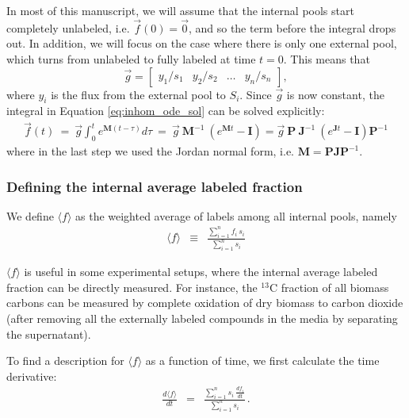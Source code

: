 \documentclass{article}
\newcommand{\fin}{\ensuremath{\langle f \rangle}}
\begin{document}
In most of this manuscript, we will assume that the internal pools start completely unlabeled, i.e. $\vec{f}(0) = \vec{0}$, and so the term before the integral drops out. In addition, we will focus on the case where there is only one external pool, which turns from unlabeled to fully labeled at time $t = 0$. This means that \[\vec{g} = \begin{bmatrix} y_1 / s_1 & y_2 / s_2 & \ldots & y_n / s_n \end{bmatrix},\] where $y_i$ is the flux from the external pool to $S_i$. Since $\vec{g}$ is now constant, the integral in Equation \ref{eq:inhom_ode_sol} can be solved explicitly:
\begin{eqnarray}
    \vec{f}(t) ~=~ \vec{g} \int_0^t e^{\mathbf{M} (t-\tau)} d\tau ~=~
    \vec{g} ~ \mathbf{M}^{-1} ~ \left( e^{\mathbf{M}t} - \mathbf{I} \right) =
    \vec{g} ~ \mathbf{P} ~ \mathbf{J}^{-1} ~ \left( e^{\mathbf{J}t} - \mathbf{I} \right) \mathbf{P}^{-1}
\end{eqnarray}
where in the last step we used the Jordan normal form, i.e. $\mathbf{M} = \mathbf{P} \mathbf{J} \mathbf{P}^{-1}$.

\subsubsection{Defining the internal average labeled fraction}

We define $\fin$ as the weighted average of labels among all internal pools, namely 
\begin{eqnarray}\label{eq:dfin_dt}
\fin &\equiv& \frac{\sum_{i=1}^{n} f_i \, s_i}{\sum_{i=1}^{n} s_i}
\end{eqnarray}

$\fin$ is useful in some experimental setups, where the internal average labeled fraction can be directly measured. For instance, the $^{13}$C fraction of all biomass carbons can be measured by complete oxidation of dry biomass to carbon dioxide (after removing all the externally labeled compounds in the media by separating the supernatant).

To find a description for $\fin$ as a function of time, we first calculate the time derivative:
\begin{eqnarray}
\frac{d\fin}{dt} &=& \frac{\sum_{i=1}^{n} s_i~\frac{d f_i}{dt}}{\sum_{i=1}^{n} s_i} \,.
\end{eqnarray}
\end{document}
